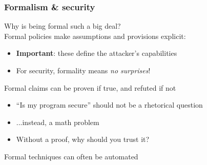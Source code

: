 \documentclass[10pt,handout]{beamer}
\begin{document}

\begin{frame}

\frametitle{Formalism \& security}

Why is being formal such a big deal?
\\[1em]

\pause
Formal policies make assumptions and provisions explicit:
\begin{itemize}
  \item \textbf{Important}: these define the attacker's capabilities
  \item For security, formality means \emph{no surprises}! \\[1em]
\end{itemize}

\pause
Formal claims can be proven if true, and refuted if not
\begin{itemize}
  \item ``Is my program secure'' should not be a rhetorical question
  \item ...instead, a math problem
  \item Without a proof, why should you trust it? \\[1em]
\end{itemize}

\pause
Formal techniques can often be automated

\end{frame}

\end{document}
